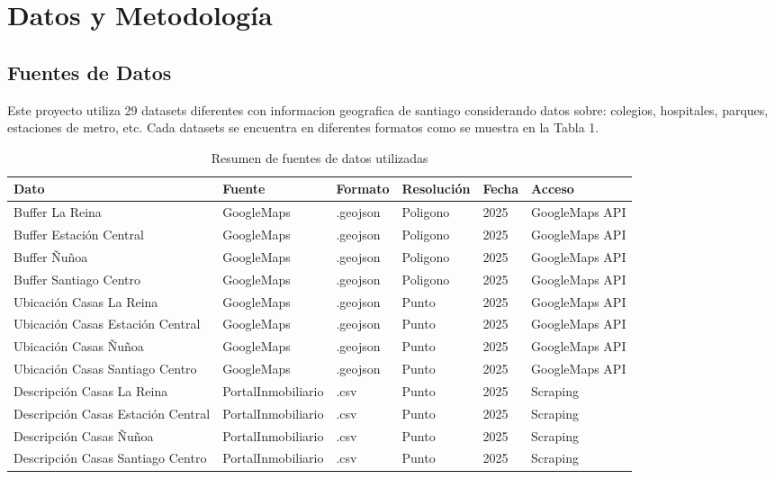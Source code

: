 \section{Datos y Metodología}

\subsection{Fuentes de Datos}

Este proyecto utiliza 29 datasets diferentes con informacion geografica de santiago considerando datos sobre: colegios, hospitales, parques, estaciones de metro, etc. Cada datasets se encuentra en diferentes formatos como se muestra en la Tabla 1.

%
\begin{table}[H]
\centering
\caption{Resumen de fuentes de datos utilizadas}
\label{tab:datos}
\begin{tabular}{@{}llllll@{}}
\toprule
\textbf{Dato} & \textbf{Fuente} & \textbf{Formato} & \textbf{Resolución} & \textbf{Fecha} & \textbf{Acceso} \\
\midrule
Buffer La Reina & GoogleMaps & .geojson & Poligono & 2025 & GoogleMaps API \\
Buffer Estación Central & GoogleMaps & .geojson & Poligono & 2025 & GoogleMaps API \\
Buffer Ñuñoa & GoogleMaps & .geojson & Poligono & 2025 & GoogleMaps API \\
Buffer Santiago Centro & GoogleMaps & .geojson & Poligono & 2025 & GoogleMaps API \\
Ubicación Casas La Reina & GoogleMaps & .geojson & Punto & 2025 & GoogleMaps API \\
Ubicación Casas Estación Central & GoogleMaps & .geojson & Punto & 2025 & GoogleMaps API \\
Ubicación Casas Ñuñoa & GoogleMaps & .geojson & Punto & 2025 & GoogleMaps API \\
Ubicación Casas Santiago Centro & GoogleMaps & .geojson & Punto & 2025 & GoogleMaps API \\
Descripción Casas La Reina & PortalInmobiliario & .csv & Punto & 2025 & Scraping \\
Descripción Casas Estación Central & PortalInmobiliario & .csv & Punto & 2025 & Scraping \\
Descripción Casas Ñuñoa & PortalInmobiliario & .csv & Punto & 2025 & Scraping \\
Descripción Casas Santiago Centro & PortalInmobiliario & .csv & Punto & 2025 & Scraping \\

\end{tabular}
\end{table}
